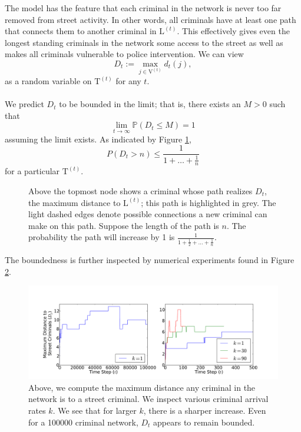 \documentclass[11pt]{article}
\newcommand{\bb}[1]{\mathbb{#1}}
\renewcommand{\L}{\mathrm{L}}
\newcommand{\T}{\mathrm{T}}
\newcommand{\V}{\mathrm{V}}
\theoremstyle{plain}
\theoremstyle{definition}
\begin{document}
The model has the feature that each criminal in the network is never too far removed from street activity.  In other words, all criminals have at least one path that connects them to another criminal in $\L^{(t)}$.  This effectively gives even the longest standing criminals in the network some access to the street as well as makes all criminals vulnerable to police intervention.  We can view
$$D_t:= \displaystyle{\max_{j \in \V^{(t)}} d_t(j)},$$
 as a random variable on $\T^{(t)}$ for any $t$.\\
\\
We predict $D_t$ to be bounded in the limit; that is, there exists an $M>0$ such that
$$\lim_{t \to \infty}\bb P( D_t\leq M) =1$$
assuming the limit exists.  As indicated by Figure \ref{harmseries},
$$ 
P\left(D_t > n\right) \leq \frac{1}{1+ \hdots + \frac{1}{n}}
$$
for a particular $\T^{(t)}$. 
\begin{figure}
\centering
{}
\caption{Above the topmost node shows a criminal whose path realizes $D_t$, the maximum distance to $\L^{(t)}$; this path is highlighted in grey.  The light dashed edges denote possible connections a new criminal can make on this path.  Suppose the length of the path is $n$.  The probability the path will increase by 1 is $\frac{1}{ 1+ \frac 12 + \hdots + \frac 1n}$.}\label{harmseries}
\end{figure}
The boundedness is further inspected by numerical experiments found in Figure \ref{lw}.

\begin{figure}\centering
\includegraphics[width =  \textwidth]{LeafWatcher.pdf}
\caption{Above, we compute the maximum distance any criminal in the network is to a street criminal.  We inspect various criminal arrival rates $k$.  We see that for larger $k$, there is a sharper increase.  Even for a 100000 criminal network, $D_t$ appears to remain bounded.}
\label{lw}
\end{figure}
\end{document}
